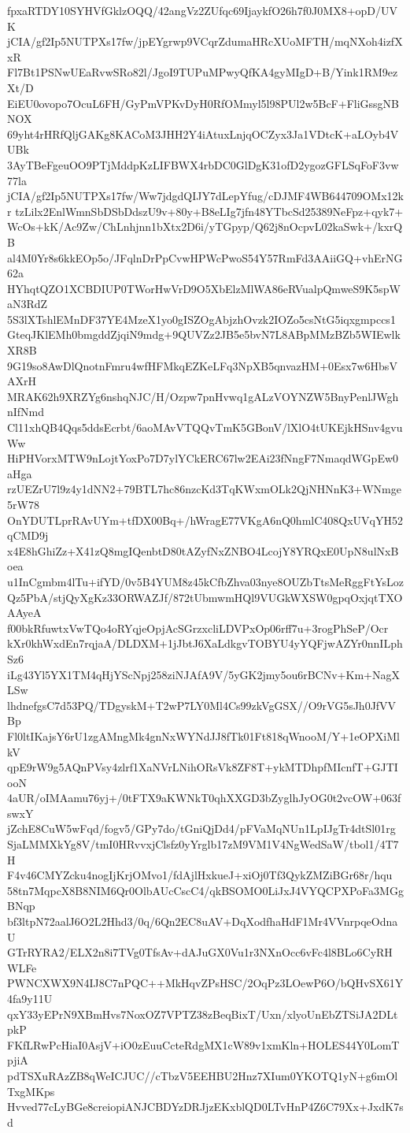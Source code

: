 fpxaRTDY10SYHVfGklzOQQ/42angVz2ZUfqc69IjaykfO26h7f0J0MX8+opD/UVK
jCIA/gf2Ip5NUTPXs17fw/jpEYgrwp9VCqrZdumaHRcXUoMFTH/mqNXoh4izfXxR
Fl7Bt1PSNwUEaRvwSRo82l/JgoI9TUPuMPwyQfKA4gyMIgD+B/Yink1RM9ezXt/D
EiEU0ovopo7OcuL6FH/GyPmVPKvDyH0RfOMmyl5l98PUl2w5BcF+FliGssgNBNOX
69yht4rHRfQljGAKg8KACoM3JHH2Y4iAtuxLnjqOCZyx3Ja1VDtcK+aLOyb4VUBk
3AyTBeFgeuOO9PTjMddpKzLIFBWX4rbDC0GlDgK31ofD2ygozGFLSqFoF3vw77la
jCIA/gf2Ip5NUTPXs17fw/Ww7jdgdQIJY7dLepYfug/cDJMF4WB644709OMx12kr
tzLilx2EnlWmnSbDSbDdszU9v+80y+B8eLIg7jfn48YTbcSd25389NeFpz+qyk7+
WcOs+kK/Ac9Zw/ChLnhjnn1bXtx2D6i/yTGpyp/Q62j8nOcpvL02kaSwk+/kxrQB
al4M0Yr8s6kkEOp5o/JFqlnDrPpCvwHPWcPwoS54Y57RmFd3AAiiGQ+vhErNG62a
HYhqtQZO1XCBDIUP0TWorHwVrD9O5XbElzMlWA86eRVualpQmweS9K5spWaN3RdZ
5S3lXTshlEMnDF37YE4MzeX1yo0gISZOgAbjzhOvzk2IOZo5csNtG5iqxgmpccs1
GteqJKlEMh0bmgddZjqiN9mdg+9QUVZz2JB5e5bvN7L8ABpMMzBZb5WIEwlkXR8B
9G19so8AwDlQnotnFmru4wfHFMkqEZKeLFq3NpXB5qnvazHM+0Esx7w6HbsVAXrH
MRAK62h9XRZYg6nshqNJC/H/Ozpw7pnHvwq1gALzVOYNZW5BnyPenlJWghnIfNmd
Cl11xhQB4Qqs5ddsEcrbt/6aoMAvVTQQvTmK5GBonV/lXlO4tUKEjkHSnv4gvuWw
HiPHVorxMTW9nLojtYoxPo7D7ylYCkERC67lw2EAi23fNngF7NmaqdWGpEw0aHga
rzUEZrU7l9z4y1dNN2+79BTL7hc86nzcKd3TqKWxmOLk2QjNHNnK3+WNmge5rW78
OnYDUTLprRAvUYm+tfDX00Bq+/hWragE77VKgA6nQ0hmlC408QxUVqYH52qCMD9j
x4E8hGhiZz+X41zQ8mgIQenbtD80tAZyfNxZNBO4LcojY8YRQxE0UpN8ulNxBoea
u1InCgmbm4lTu+ifYD/0v5B4YUM8z45kCfbZhva03nye8OUZbTtsMeRggFtYsLoz
Qz5PbA/stjQyXgKz33ORWAZJf/872tUbmwmHQl9VUGkWXSW0gpqOxjqtTXOAAyeA
f00bkRfuwtxVwTQo4oRYqjeOpjAcSGrzxcliLDVPxOp06rff7u+3rogPhSeP/Ocr
kXr0khWxdEn7rqjaA/DLDXM+1jJbtJ6XaLdkgvTOBYU4yYQFjwAZYr0nnILphSz6
iLg43Yl5YX1TM4qHjYScNpj258ziNJAfA9V/5yGK2jmy5ou6rBCNv+Km+NagXLSw
lhdnefgsC7d53PQ/TDgyskM+T2wP7LY0Ml4Cs99zkVgGSX//O9rVG5sJh0JfVVBp
Fl0ltIKajsY6rU1zgAMngMk4gnNxWYNdJJ8fTk01Ft818qWnooM/Y+1eOPXiMlkV
qpE9rW9g5AQnPVsy4zlrf1XaNVrLNihORsVk8ZF8T+ykMTDhpfMIcnfT+GJTIooN
4aUR/oIMAamu76yj+/0tFTX9aKWNkT0qhXXGD3bZyglhJyOG0t2vcOW+063fswxY
jZchE8CuW5wFqd/fogv5/GPy7do/tGniQjDd4/pFVaMqNUn1LpIJgTr4dtSl01rg
SjaLMMXkYg8V/tmI0HRvvxjClsfz0yYrglb17zM9VM1V4NgWedSaW/tbol1/4T7H
F4v46CMYZcku4nogIjKrjOMvo1/fdAjlHxkueJ+xiOj0Tf3QykZMZiBGr68r/hqu
58tn7MqpcX8B8NIM6Qr0OlbAUcCscC4/qkBSOMO0LiJxJ4VYQCPXPoFa3MGgBNqp
bf3ltpN72aalJ6O2L2Hhd3/0q/6Qn2EC8uAV+DqXodfhaHdF1Mr4VVnrpqeOdnaU
GTrRYRA2/ELX2n8i7TVg0TfsAv+dAJuGX0Vu1r3NXnOcc6vFc4l8BLo6CyRHWLFe
PWNCXWX9N4IJ8C7nPQC++MkHqvZPsHSC/2OqPz3LOewP6O/bQHvSX61Y4fa9y11U
qxY33yEPrN9XBmHvs7NoxOZ7VPTZ38zBeqBixT/Uxn/xlyoUnEbZTSiJA2DLtpkP
FKfLRwPcHiaI0AsjV+iO0zEuuCcteRdgMX1cW89v1xmKln+HOLES44Y0LomTpjiA
pdTSXuRAzZB8qWeICJUC//cTbzV5EEHBU2Hnz7XIum0YKOTQ1yN+g6mOlTxgMKps
Hvved77cLyBGe8creiopiANJCBDYzDRJjzEKxblQD0LTvHnP4Z6C79Xx+JxdK7sd
